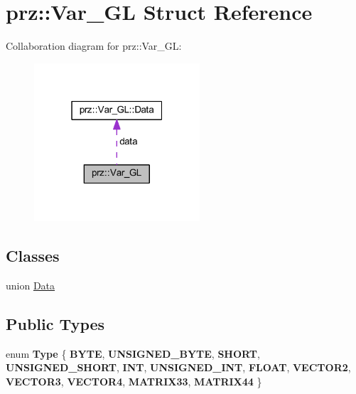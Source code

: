 \hypertarget{structprz_1_1_var___g_l}{}\section{prz\+::Var\+\_\+\+GL Struct Reference}
\label{structprz_1_1_var___g_l}


Collaboration diagram for prz\+::Var\+\_\+\+GL\+:
\nopagebreak
\begin{figure}[H]
\begin{center}
\leavevmode
\includegraphics[width=175pt]{structprz_1_1_var___g_l__coll__graph}
\end{center}
\end{figure}
\subsection*{Classes}
\begin{DoxyCompactItemize}
\item 
union \mbox{\hyperlink{unionprz_1_1_var___g_l_1_1_data}{Data}}
\end{DoxyCompactItemize}
\subsection*{Public Types}
\begin{DoxyCompactItemize}
\item 
\mbox{\label{structprz_1_1_var___g_l_abb9265cd95013196bcb323b41b67d770}} 
enum {\bfseries Type} \{ \newline
{\bfseries B\+Y\+TE}, 
{\bfseries U\+N\+S\+I\+G\+N\+E\+D\+\_\+\+B\+Y\+TE}, 
{\bfseries S\+H\+O\+RT}, 
{\bfseries U\+N\+S\+I\+G\+N\+E\+D\+\_\+\+S\+H\+O\+RT}, 
\newline
{\bfseries I\+NT}, 
{\bfseries U\+N\+S\+I\+G\+N\+E\+D\+\_\+\+I\+NT}, 
{\bfseries F\+L\+O\+AT}, 
{\bfseries V\+E\+C\+T\+O\+R2}, 
\newline
{\bfseries V\+E\+C\+T\+O\+R3}, 
{\bfseries V\+E\+C\+T\+O\+R4}, 
{\bfseries M\+A\+T\+R\+I\+X33}, 
{\bfseries M\+A\+T\+R\+I\+X44}
 \}
\end{DoxyCompactItemize}
